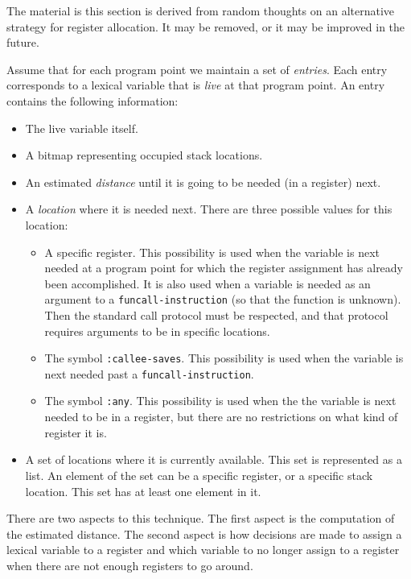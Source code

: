 The material is this section is derived from random thoughts on an
alternative strategy for register allocation.  It may be removed, or
it may be improved in the future.

Assume that for each program point we maintain a set of
\emph{entries}.  Each entry corresponds to a lexical variable that is
\emph{live} at that program point.  An entry contains the following
information:

\begin{itemize}
\item The live variable itself.
\item A bitmap representing occupied stack locations.
\item An estimated \emph{distance} until it is going to be needed (in
  a register) next.
\item A \emph{location} where it is needed next.  There are three
  possible values for this location:
  \begin{itemize}
  \item A specific register.  This possibility is used when the
    variable is next needed at a program point for which the register
    assignment has already been accomplished.  It is also used when a
    variable is needed as an argument to a
    \texttt{funcall-instruction} (so that the function is unknown).
    Then the standard call protocol must be respected, and that
    protocol requires arguments to be in specific locations.
  \item The symbol \texttt{:callee-saves}.  This possibility is used
    when the variable is next needed past a
    \texttt{funcall-instruction}.
  \item The symbol \texttt{:any}.  This possibility is used when the
    the variable is next needed to be in a register, but there are no
    restrictions on what kind of register it is.
  \end{itemize}
\item A set of locations where it is currently available.  This set is
  represented as a list.  An element of the set can be a specific
  register, or a specific stack location.  This set has at least one
  element in it.
\end{itemize}

There are two aspects to this technique.  The first aspect is the
computation of the estimated distance.  The second aspect is how
decisions are made to assign a lexical variable to a register and
which variable to no longer assign to a register when there are not
enough registers to go around.

